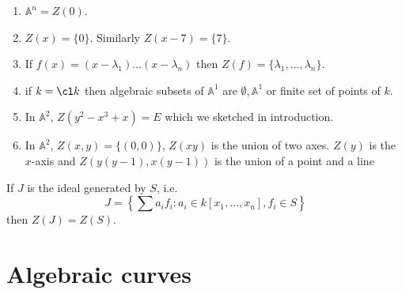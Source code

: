 \documentclass[a4paper]{article}
\renewcommand{\A}{\mathbb{A}}
\begin{document}
\begin{eg}\leavevmode
  \begin{enumerate}
  \item \(\A^n = Z(0)\).
  \item \(Z(x) = \{0\}\). Similarly \(Z(x - 7) = \{7\}\).
  \item If \(f(x) = (x - \lambda_1) \dots (x - \lambda_n)\) then \(Z(f) = \{\lambda_1, \dots, \lambda_n\}\).
  \item if \(k = \cl k\) then algebraic subsets of \(\A^1\) are \(\emptyset, \A^1\) or finite set of points of \(k\).
  \item In \(\A^2\), \(Z(y^2 - x^3 + x) = E\) which we sketched in introduction.
  \item In \(\A^2\), \(Z(x, y) = \{(0, 0)\}\), \(Z(xy)\) is the union of two axes. \(Z(y)\) is the \(x\)-axis and \(Z(y(y - 1), x(y - 1))\) is the union of a point and a line
  \end{enumerate}
\end{eg}

If \(J\) is the ideal generated by \(S\), i.e.
\[
  J = \left\{\sum a_i f_i: a_i \in k[x_1, \dots, x_n], f_i \in S\right\}
\]
then \(Z(J) = Z(S)\).







\iffalse

\section{Algebraic curves}
\end{document}
